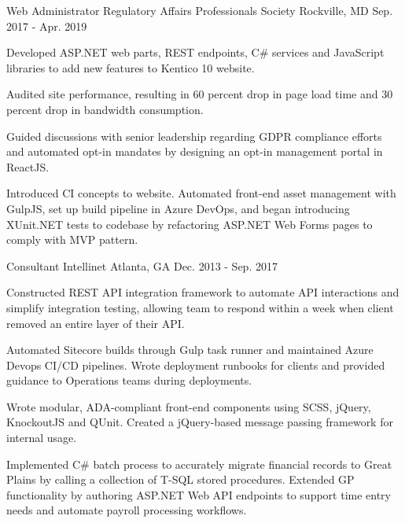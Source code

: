 \begin{cventries}
  \cventry
    {Web Administrator} %
    {Regulatory Affairs Professionals Society} %
    {Rockville, MD} %
    {Sep. 2017 - Apr. 2019} %
    {
      \begin{cvitems} %
        \item {Developed ASP.NET web parts, REST endpoints, C\# services and JavaScript libraries to add new features to Kentico 10 website.}
        \item {Audited site performance, resulting in 60 percent drop in page load time and 30 percent drop in bandwidth consumption.}
        \item {Guided discussions with senior leadership regarding GDPR compliance efforts and automated opt-in mandates by designing an opt-in management portal in ReactJS.}
        \item {Introduced CI concepts to website. Automated front-end asset management with GulpJS, set up build pipeline in Azure DevOps, and began introducing XUnit.NET tests to codebase by refactoring ASP.NET Web Forms pages to comply with MVP pattern.}
      \end{cvitems}
    }

  \cventry
    {Consultant} %
    {Intellinet} %
    {Atlanta, GA} %
    {Dec. 2013 - Sep. 2017} %
    {
      \begin{cvitems} %
        \item {Constructed REST API integration framework to automate API interactions and simplify integration testing, allowing team to respond within a week when client removed an entire layer of their API.}
        \item {Automated Sitecore builds through Gulp task runner and maintained Azure Devops CI/CD pipelines. Wrote deployment runbooks for clients and provided guidance to Operations teams during deployments.}
        \item {Wrote modular, ADA-compliant front-end components using SCSS, jQuery, KnockoutJS and QUnit. Created a jQuery-based message passing framework for internal usage.}
        \item {Implemented C\# batch process to accurately migrate financial records to Great Plains by calling a collection of T-SQL stored procedures. Extended GP functionality by authoring ASP.NET Web API endpoints to support time entry needs and automate payroll processing workflows.}
      \end{cvitems}
    }


\end{cventries}
